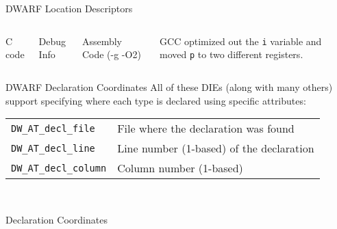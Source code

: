 \begin{frame}{DWARF Location Descriptors}
\begin{columns}

\begin{block}{C code}
\end{block}
\begin{block}{Debug Info}
\end{block}

\begin{block}{Assembly Code (-g -O2)}
\end{block}

GCC optimized out the \texttt{i} variable and moved \texttt{p}
to two different registers.

\end{columns}
\end{frame}


\begin{frame}{DWARF Declaration Coordinates}
All of these DIEs (along with many others) support specifying where each type is declared
using specific attributes:\\
\medskip
\begin{tabular}{ l l }
\texttt{DW\_AT\_decl\_file} & File where the declaration was found \\
\texttt{DW\_AT\_decl\_line} & Line number (1-based) of the declaration \\
\texttt{DW\_AT\_decl\_column} & Column number (1-based) \\
\end{tabular}\\
\medskip
\begin{block}{Declaration Coordinates}
\end{block}
\end{frame}



